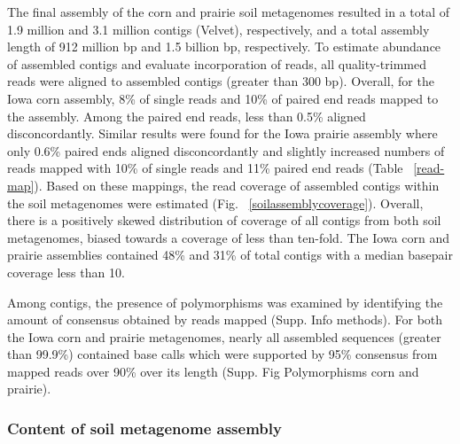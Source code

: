 \documentclass[11pt]{article} %
\begin{document}
The final assembly of the corn and prairie soil metagenomes resulted in a total of 1.9 million and 3.1 million contigs (Velvet), respectively, and a total assembly length of 912 million bp and 1.5 billion bp, respectively.  To estimate abundance of assembled contigs and evaluate incorporation of reads, all quality-trimmed reads were aligned to assembled contigs (greater than 300 bp).  Overall, for the Iowa corn assembly, 8\% of single reads and 10\% of paired end reads mapped to the assembly.  Among the paired end reads, less than 0.5\% aligned disconcordantly.  Similar results were found for the Iowa prairie assembly where only 0.6\% paired ends aligned disconcordantly and slightly increased numbers of reads mapped with 10\% of single reads and 11\% paired end reads (Table ~\ref{read-map}).  Based on these mappings, the read coverage of assembled contigs within the soil metagenomes were estimated (Fig. ~\ref{soilassemblycoverage}).  Overall, there is a positively skewed distribution of coverage of all contigs from both soil metagenomes, biased towards a coverage of less than ten-fold.  The Iowa corn and prairie assemblies contained 48\% and 31\% of total contigs with a median basepair coverage less than 10.  

Among contigs, the presence of polymorphisms was examined by identifying the amount of consensus obtained by reads mapped (Supp. Info methods).  For both the Iowa corn and prairie metagenomes, nearly all assembled sequences (greater than 99.9\%) contained base calls which were supported by 95\% consensus from mapped reads over 90\% over its length (Supp. Fig Polymorphisms corn and prairie).  



\subsubsection{Content of soil metagenome assembly}

\end{document}
